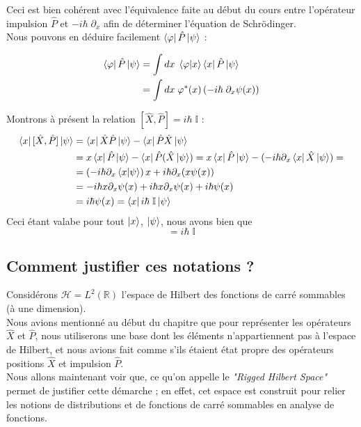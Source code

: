 \documentclass{article}
\begin{document}
Ceci est bien cohérent avec l'équivalence faite au début du cours entre l'opérateur impulsion $\hat{P}$ et $-i\hbar \; \partial_x$ afin de déterminer l'équation de Schrödinger. \\
Nous pouvons en déduire facilement $\bra{\varphi} \hat{P} \ket{\psi}$ : 

\begin{align}
    \bra{\varphi} \hat{P} \ket{\psi} &= \int dx \; \braket{\varphi | x} \bra{x} \hat{P} \ket{\psi} \notag \\
    &= \int dx \; \varphi^*(x) \left( -i\hbar \; \partial_x \psi(x) \right) \notag \\
\end{align}

Montrons à présent la relation $[\hat{X}, \hat{P}] = i\hbar \; \mathbb{I}$ : 
\begin{align}
    \bra{x}[\hat{X}, \hat{P}] \ket{\psi} &= \bra{x} \hat{X}\hat{P}\ket{\psi} - \bra{x} \hat{P}\hat{X}\ket{\psi} \notag \\
    &= x \bra{x}\hat{P}\ket{\psi} - \bra{x}\hat{P}(\hat{X}\ket{\psi}) = x \bra{x}\hat{P}\ket{\psi} - ( -i\hbar \partial_x \bra{x}\hat{X}\ket{\psi} ) = \notag \\
    &= \left( -i\hbar \partial_x \braket{x|\psi} \right) x + i\hbar \partial_x (x \psi(x)) \notag \\
    &= -i\hbar x \partial_x \psi(x) + i\hbar x\partial_x \psi(x) + i\hbar \psi(x) \notag \\
    &= i\hbar \psi(x) = \bra{x} i\hbar \; \mathbb{I}\ket{\psi} 
\end{align}
Ceci étant valabe pour tout $\ket{x}$, $\ket{\psi}$, nous avons bien que \begin{equation}
     [\hat{X}, \hat{P}] = i\hbar \; \mathbb{I} \end{equation} 

\subsection*{Comment justifier ces notations ?}

Considérons $\mathcal{H} = L^2(\mathbb{R})$ l'espace de Hilbert des fonctions de carré sommables (à une dimension). \\ 
Nous avions mentionné au début du chapitre que pour représenter les opérateurs $\hat{X}$ et $\hat{P}$, nous utiliserons une base dont les éléments n'appartiennent pas à l'espace de Hilbert, et nous avions fait comme s'ils étaient état propre des opérateurs positions $\hat{X}$ et impulsion $\hat{P}$. \\
Nous allons maintenant voir que, ce qu'on appelle le \textit{"Rigged Hilbert Space"} permet de justifier cette démarche ; en effet, cet espace est construit pour relier les notions de distributions et de fonctions de carré sommables en analyse de fonctions. \\
\end{document}
